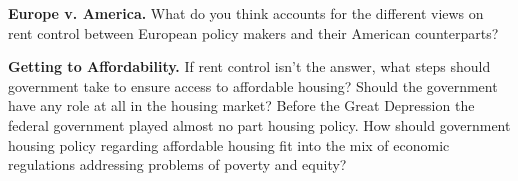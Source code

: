 
\item \textbf{Europe v. America.}  What do you think accounts for the different
views on rent control between European policy makers and their American
counterparts? 


\item \textbf{Getting to Affordability.} If rent control isn't the
answer, what steps should government take to ensure access to affordable
housing? Should the government have any role at all in the housing market? 
Before the Great Depression the federal government played almost no part
housing policy. How should government housing policy regarding affordable
housing fit into the mix of economic regulations addressing problems of poverty
and equity?

